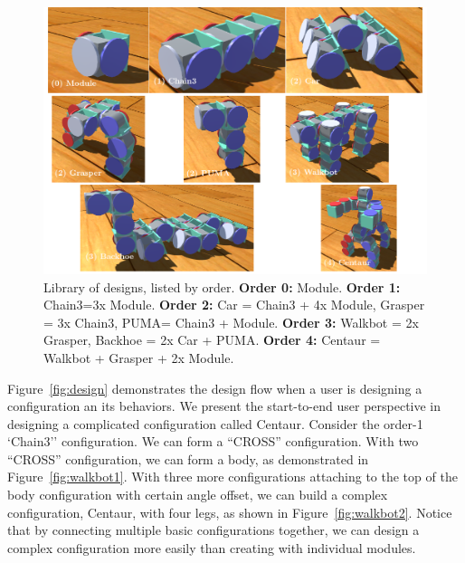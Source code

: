 \documentclass[graybox]{svmult}
\begin{document}
\begin{figure}
  \begin{center}
    \includegraphics[width=\textwidth]{images/library/bigGrid.pdf}
    \caption{Library of designs, listed by order. 
    \textbf{Order 0:} Module. \textbf{Order 1:} Chain3=3x Module.
    \textbf{Order 2:} Car = Chain3 + 4x Module, Grasper = 3x Chain3, PUMA= Chain3 + Module.
    \textbf{Order 3:} Walkbot = 2x Grasper, Backhoe = 2x Car + PUMA.
    \textbf{Order 4:} Centaur = Walkbot + Grasper + 2x Module.}
    \label{fig:library}
  \end{center}
\end{figure}



Figure~\ref{fig:design} demonstrates the design flow when a user is designing a configuration an its behaviors. We present the start-to-end user perspective in designing a complicated configuration called Centaur. Consider the
order-1 `Chain3'' configuration. We can form a ``CROSS'' configuration. With two ``CROSS'' configuration, we can form a body, as demonstrated in Figure~\ref{fig:walkbot1}. With three more configurations attaching to the top of the body configuration with certain angle offset, we can build a complex configuration, Centaur, with four legs, as shown in Figure~\ref{fig:walkbot2}. Notice that by connecting multiple  basic configurations together, we can design a complex configuration more easily than creating with individual modules.
\end{document}
